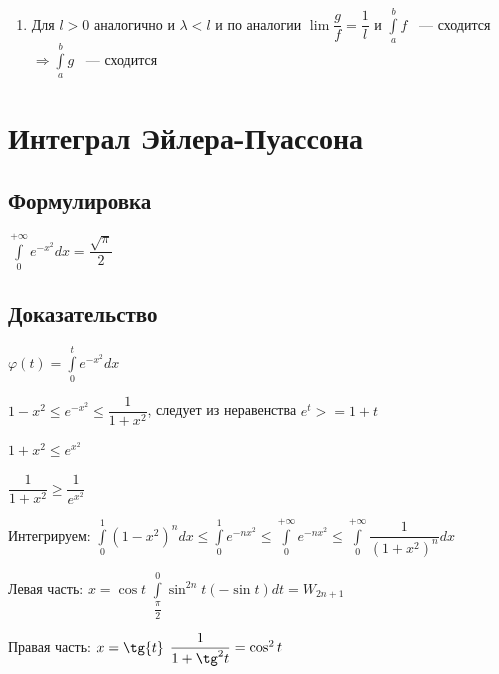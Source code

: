 \documentclass{article}
\begin{document}
\begin{enumerate}
\begin{itemize}
\begin{enumerate}
                                \item Для $l > 0$ аналогично и $\lambda < l$ и по аналогии $\lim \dfrac{g}{f} = \dfrac{1}{l}$ и $\int\limits^b_a f$ ~--- сходится $\Rightarrow \int\limits^b_a g$ ~--- сходится
                                
                            \end{enumerate}
                        
                    \end{itemize}
                
            \end{enumerate}
    
    \newpage
    
    \section{Интеграл Эйлера-Пуассона}
    
        \subsection{Формулировка}
        
            $\int\limits^{+\infty}_0 e^{-x^2} dx = \dfrac{\sqrt{\pi}}{2}$
            
        \subsection{Доказательство}
        
            $\varphi(t) = \int\limits^t_0 e^{-x^2} dx$
            
            $1 - x^2 \leq e^{-x^2} \leq \dfrac{1}{1 + x^2}$, следует из неравенства $e^t >= 1 + t$
            
            $1 + x^2 \leq e^{x^2}$
            
            $\dfrac{1}{1 + x^2} \geq \dfrac{1}{e^{x^2}}$
            
            Интегрируем: $\int\limits^1_0 (1 - x^2)^n dx \leq \int\limits^1_0 e^{-nx^2} \leq \int\limits^{+\infty}_0 e^{-nx^2} \leq \int\limits^{+\infty}_{0} \dfrac{1}{(1 + x^2)^n} dx$
            
            Левая часть: $x = \cos{t}$ $\int\limits^0_{\dfrac{\pi}{2}} \sin^{2n} {t} (-\sin{t}) dt = W_{2n + 1}$
            
            Правая часть: $x = \tg {t}$ $\dfrac{1}{1 + \tg^2{t}} = \cos^2{t}$
            
\end{document}
